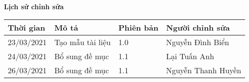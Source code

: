 \documentclass[./main.tex]{subfiles}
\begin{document}
	\begin{center}
		\Large{\textbf{Lịch sử chỉnh sửa}}
		\begin{table}[H]
		\begin{tabular}{|p{}|p{}|p{}|p{}|}
				\hline
				\textbf{Thời gian} & \textbf{Mô tả}   & \textbf{Phiên bản} & \textbf{Người chỉnh sửa}                                                 \\ \hline
				23/03/2021 & Tạo mẫu tài liệu & 1.0 & Nguyễn Đình Biển   \\ \hline
				24/03/2021 & Bổ sung đề mục   & 1.1 & Lại Tuấn Anh       \\ \hline
				26/03/2021 & Bổ sung đề mục   & 1.1 & Nguyễn Thanh Huyền \\ \hline
			\end{tabular}
		\end{table}
	\end{center}
	
\end{document}
